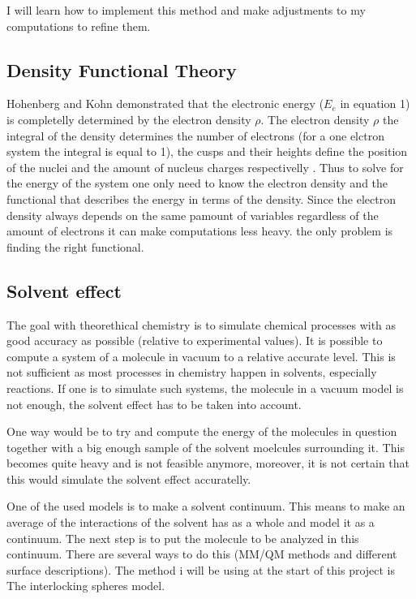 \documentclass[a4paper,11pt]{article}
\begin{document}
I will learn how to implement this method and make adjustments to my computations to refine them.

\subsection{Density Functional Theory}

Hohenberg and Kohn 
demonstrated that the
electronic energy ($E_e$ in equation 1) is completelly determined by
the electron density $\rho$\cite{Jensen:2017,parr1994density}. The electron density $\rho$ the integral of the
density determines the number of electrons (for a one elctron system
the integral is equal to 1), the cusps and their heights define the
position of the nuclei and the amount of nucleus charges
respectivelly \cite{Koch:2001dn}.  Thus to solve for the energy of the system one only
need to know the electron density and the functional that describes
the energy in terms of the density. Since the electron density always
depends on the same pamount of variables regardless of the amount of
electrons it can make computations less heavy. the only problem is
finding the right functional.


\subsection{Solvent effect}

The goal with theorethical chemistry is to simulate chemical processes
with as good accuracy as possible (relative to experimental
values). It is possible to compute a system of a molecule in vacuum to
a relative accurate level. This is not sufficient as most processes in
chemistry happen in solvents, especially reactions. If one is to
simulate such systems, the molecule in a vacuum model is not enough,
the solvent effect has to be taken into account.

One way would be to try and compute the energy of the molecules in
question together with a big enough sample of the solvent moelcules
surrounding it. This becomes quite heavy and is not feasible anymore,
moreover, it is not certain that this would simulate the solvent
effect accuratelly.

One of the used models is to make a solvent continuum. This means to
make an average of the interactions of the solvent has as a whole and model it as a continuum. The next step is to put the molecule to be analyzed in this continuum. There are several ways to do this (MM/QM
methods and different surface descriptions). The method i will be
using at the start of this project is The interlocking spheres model.
\end{document}
